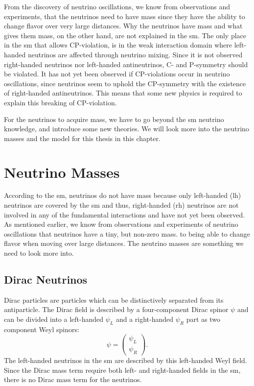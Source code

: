 \documentclass[a4paper, american, 12pt]{report}
\begin{document}
	From the discovery of neutrino oscillations, we know from observations and experiments, that the neutrinos need to have mass since they have the ability to change flavor over very large distances. Why the neutrinos have mass and what gives them mass, on the other hand, are not explained in the \acrshort{sm}. The only place in the \acrshort{sm} that allows CP-violation, is in the weak interaction domain where left-handed neutrinos are affected through neutrino mixing. Since it is not observed right-handed neutrinos nor left-handed antineutrinos, C- and P-symmetry should be violated. It has not yet been observed if CP-violations occur in neutrino oscillations, since neutrinos seem to uphold the CP-symmetry with the existence of right-handed antineutrinos. This means that some new physics is required to explain this breaking of CP-violation.
	
	For the neutrinos to acquire mass, we have to go beyond the \acrshort{sm} neutrino knowledge, and introduce some new theories. We will look more into the neutrino masses and the model for this thesis in this chapter.
	
	
	\section{Neutrino Masses}
	\label{sect:Theory-Neutrino_beyond} 
	According to the \acrshort{sm}, neutrinos do not have mass because only left-handed (\acrshort{lh}) neutrinos are covered by the \acrshort{sm} and thus, right-handed (\acrshort{rh}) neutrinos are not involved in any of the fundamental interactions and have not yet been observed. As mentioned earlier, we know from observations and experiments of neutrino oscillations that neutrinos have a tiny, but non-zero mass. to being able to change flavor when moving over large distances. The neutrino masses are something we need to look more into.
	

	\subsection{Dirac Neutrinos}
	\label{subsect:Theory-Dirac_n}
	Dirac particles are particles which can be distinctively separated from its antiparticle. The Dirac field is described by a four-component Dirac spinor $\psi$ and can be divided into a left-handed $\psi_L$ and a right-handed $\psi_R$ part as two component Weyl spinors:
	\begin{equation}
	\label{eq:Dirac_spinors}
		\psi=
		\begin{pmatrix}
		\psi_L \\ \psi_R 
		\end{pmatrix}.
	\end{equation}
	The left-handed neutrinos in the \acrshort{sm} are described by this left-handed Weyl field. Since the Dirac mass term require both left- and right-handed fields in the \acrshort{sm}, there is no Dirac mass term for the neutrinos.
	
\end{document}
